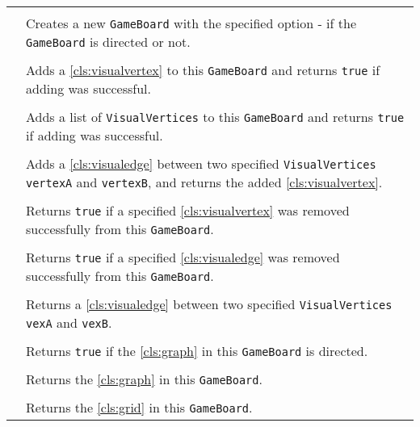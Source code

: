 \paragraph*{}
\begin{longtable}{Lp{10cm}}
	\startmethodtable
	 \\
	& Creates a new \texttt{GameBoard} with the specified option - if the \texttt{GameBoard} is directed or not. \\
	 \\
	& Adds a \ref{cls:visualvertex} to this \texttt{GameBoard} and returns \texttt{true} if adding was successful. \\
	 \\
	& Adds a list of \texttt{VisualVertices} to this \texttt{GameBoard} and returns \texttt{true} if adding was successful. \\
	 \\
	& Adds a \ref{cls:visualedge} between two specified \texttt{VisualVertices} \texttt{vertexA} and \texttt{vertexB}, and returns the added \ref{cls:visualvertex}. \\
	 \\
	& Returns \texttt{true} if a specified \ref{cls:visualvertex} was removed successfully from this \texttt{GameBoard}. \\
	 \\
	& Returns \texttt{true} if a specified \ref{cls:visualedge} was removed successfully from this \texttt{GameBoard}. \\
	 \\
	& Returns a \ref{cls:visualedge} between two specified \texttt{VisualVertices} \texttt{vexA} and \texttt{vexB}. \\
	 \\
	& Returns \texttt{true} if the \ref{cls:graph} in this \texttt{GameBoard} is directed. \\
	 \\
	& Returns the \ref{cls:graph} in this \texttt{GameBoard}. \\
	 \\
	& Returns the \ref{cls:grid} in this \texttt{GameBoard}. \\
	\hline
\end{longtable}

